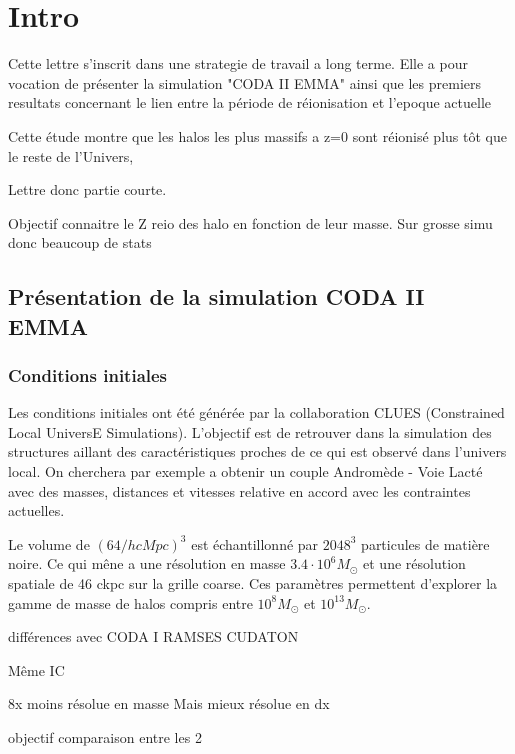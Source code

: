 \section{Intro}

Cette lettre s'inscrit dans une strategie de travail a long terme.
Elle a pour vocation de présenter la simulation "CODA II EMMA" ainsi que les premiers resultats concernant le lien entre la période de réionisation et l'epoque actuelle

Cette étude montre que les halos les plus massifs a z=0 sont réionisé plus tôt que le reste de l'Univers,  

Lettre donc partie courte.


Objectif connaitre le Z reio des halo en fonction de leur masse.
Sur grosse simu donc beaucoup de stats


\subsection{Présentation de la simulation CODA II EMMA}

\subsubsection{Conditions initiales}

Les conditions initiales ont été générée par la collaboration CLUES (Constrained Local UniversE Simulations).
L'objectif est de retrouver dans la simulation des structures aillant des caractéristiques proches de ce qui est observé dans l'univers local.
On cherchera par exemple a obtenir un couple Andromède - Voie Lacté avec des masses, distances et vitesses relative en accord avec les contraintes actuelles.


Le volume de $\left( 64/h cMpc \right) ^3$ est échantillonné par $2048^3$ particules de matière noire.
Ce qui mêne a une résolution en masse $3.4 \cdot 10^6 M_\odot$ et une résolution spatiale de 46 ckpc sur la grille coarse.
Ces paramètres permettent d'explorer la gamme de masse de halos compris entre $10^8 M_\odot$ et  $10^{13}M_\odot$.



différences avec 
CODA I RAMSES CUDATON 

Même IC 

8x moins résolue en masse 
Mais mieux résolue en dx





objectif comparaison entre les 2 


